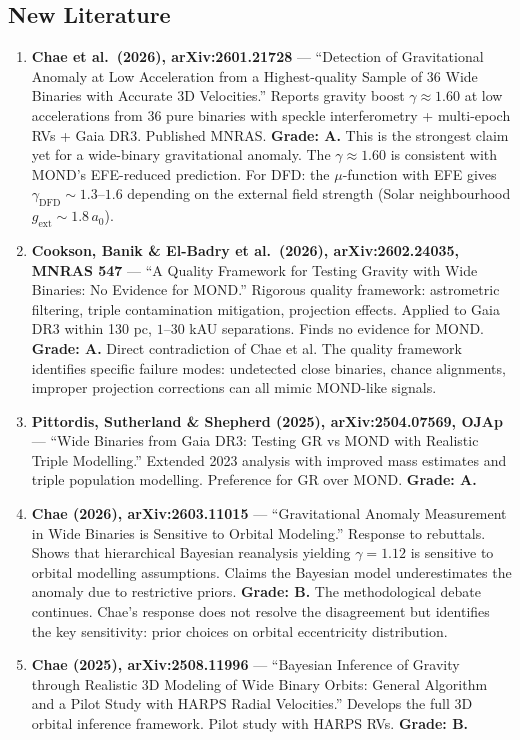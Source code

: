 \documentclass[11pt,a4paper]{article}
\begin{document}
\subsection{New Literature}

\begin{enumerate}

\item \textbf{Chae et al.\ (2026), arXiv:2601.21728} --- ``Detection of Gravitational Anomaly at Low Acceleration from a Highest-quality Sample of 36 Wide Binaries with Accurate 3D Velocities.'' Reports gravity boost $\gamma \approx 1.60$ at low accelerations from 36 pure binaries with speckle interferometry + multi-epoch RVs + Gaia DR3. Published MNRAS. \textbf{Grade: A.} This is the strongest claim yet for a wide-binary gravitational anomaly. The $\gamma \approx 1.60$ is consistent with MOND's EFE-reduced prediction. For DFD: the $\mu$-function with EFE gives $\gamma_\mathrm{DFD} \sim 1.3$--$1.6$ depending on the external field strength (Solar neighbourhood $g_\mathrm{ext} \sim 1.8\,a_0$).

\item \textbf{Cookson, Banik \& El-Badry et al.\ (2026), arXiv:2602.24035, MNRAS 547} --- ``A Quality Framework for Testing Gravity with Wide Binaries: No Evidence for MOND.'' Rigorous quality framework: astrometric filtering, triple contamination mitigation, projection effects. Applied to Gaia DR3 within 130 pc, $1$--$30$ kAU separations. Finds no evidence for MOND. \textbf{Grade: A.} Direct contradiction of Chae et al. The quality framework identifies specific failure modes: undetected close binaries, chance alignments, improper projection corrections can all mimic MOND-like signals.

\item \textbf{Pittordis, Sutherland \& Shepherd (2025), arXiv:2504.07569, OJAp} --- ``Wide Binaries from Gaia DR3: Testing GR vs MOND with Realistic Triple Modelling.'' Extended 2023 analysis with improved mass estimates and triple population modelling. Preference for GR over MOND. \textbf{Grade: A.}

\item \textbf{Chae (2026), arXiv:2603.11015} --- ``Gravitational Anomaly Measurement in Wide Binaries is Sensitive to Orbital Modeling.'' Response to rebuttals. Shows that hierarchical Bayesian reanalysis yielding $\gamma = 1.12$ is sensitive to orbital modelling assumptions. Claims the Bayesian model underestimates the anomaly due to restrictive priors. \textbf{Grade: B.} The methodological debate continues. Chae's response does not resolve the disagreement but identifies the key sensitivity: prior choices on orbital eccentricity distribution.

\item \textbf{Chae (2025), arXiv:2508.11996} --- ``Bayesian Inference of Gravity through Realistic 3D Modeling of Wide Binary Orbits: General Algorithm and a Pilot Study with HARPS Radial Velocities.'' Develops the full 3D orbital inference framework. Pilot study with HARPS RVs. \textbf{Grade: B.}

\end{enumerate}
\end{document}
